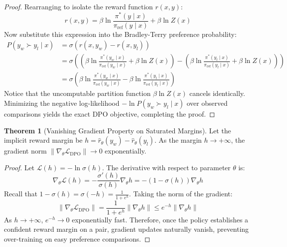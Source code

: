 \documentclass[11pt,a4paper]{article}
\theoremstyle{definition}
\newtheorem{theorem}{\textbf{Theorem}}[section]
\begin{document}
\begin{proof}
Rearranging to isolate the reward function $r(x, y)$:
{\boldmath
\begin{equation}
r(x, y) = \beta \ln \frac{\pi^*(y \mid x)}{\pi_{\text{ref}}(y \mid x)} + \beta \ln Z(x)
\end{equation}
}
Now substitute this expression into the Bradley-Terry preference probability:
{\boldmath
\begin{align}
P(y_w \succ y_l \mid x) &= \sigma\left( r(x, y_w) - r(x, y_l) \right) \\
&= \sigma\left( \left( \beta \ln \frac{\pi^*(y_w \mid x)}{\pi_{\text{ref}}(y_w \mid x)} + \beta \ln Z(x) \right) - \left( \beta \ln \frac{\pi^*(y_l \mid x)}{\pi_{\text{ref}}(y_l \mid x)} + \beta \ln Z(x) \right) \right) \\
&= \sigma\left( \beta \ln \frac{\pi^*(y_w \mid x)}{\pi_{\text{ref}}(y_w \mid x)} - \beta \ln \frac{\pi^*(y_l \mid x)}{\pi_{\text{ref}}(y_l \mid x)} \right)
\end{align}
}
Notice that the uncomputable partition function $\beta \ln Z(x)$ cancels identically.
Minimizing the negative log-likelihood $-\ln P(y_w \succ y_l \mid x)$ over observed comparisons yields the exact DPO objective, completing the proof.
\end{proof}

\begin{theorem}[Vanishing Gradient Property on Saturated Margins]
Let the implicit reward margin be $h = \hat{r}_\theta(y_w) - \hat{r}_\theta(y_l)$. As the margin $h \to +\infty$, the gradient norm $\|\nabla_\theta \mathcal{L}_{\text{DPO}}\| \to 0$ exponentially.
\end{theorem}

\begin{proof}
Let $\mathcal{L}(h) = -\ln \sigma(h)$.
The derivative with respect to parameter $\theta$ is:
{\boldmath
\begin{equation}
\nabla_\theta \mathcal{L}(h) = -\frac{\sigma'(h)}{\sigma(h)} \nabla_\theta h = -(1 - \sigma(h)) \nabla_\theta h
\end{equation}
}
Recall that $1 - \sigma(h) = \sigma(-h) = \frac{1}{1 + e^h}$.
Taking the norm of the gradient:
{\boldmath
\begin{equation}
\|\nabla_\theta \mathcal{L}_{\text{DPO}}\| = \frac{1}{1 + e^h} \|\nabla_\theta h\| \le e^{-h} \|\nabla_\theta h\|
\end{equation}
}
As $h \to +\infty$, $e^{-h} \to 0$ exponentially fast.
Therefore, once the policy establishes a confident reward margin on a pair, gradient updates naturally vanish, preventing over-training on easy preference comparisons.
\end{proof}
\end{document}
